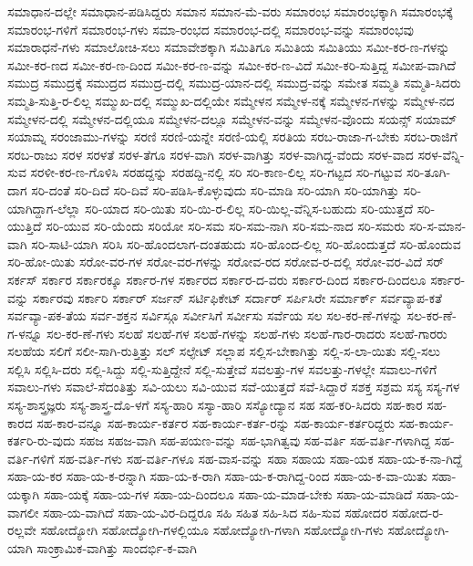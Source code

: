 {ಸಮಾಧಾನ-ದಲ್ಲೇ
ಸಮಾಧಾನ-ಪಡಿಸಿದ್ದರು
ಸಮಾನ
ಸಮಾನ-ಮೆ-ವರು
ಸಮಾರಂಭ
ಸಮಾರಂಭಕ್ಕಾಗಿ
ಸಮಾರಂಭಕ್ಕೆ
ಸಮಾರಂಭ-ಗಳಿಗೆ
ಸಮಾರಂಭ-ಗಳು
ಸಮಾ-ರಂಭದ
ಸಮಾರಂಭ-ದಲ್ಲಿ
ಸಮಾರಂಭ-ವನ್ನು
ಸಮಾರಂಭವು
ಸಮಾರಾಧನೆ-ಗಳು
ಸಮಾಲೋಚಿ-ಸಲು
ಸಮಾವೇಶಕ್ಕಾಗಿ
ಸಮಿತಿಗೂ
ಸಮಿತಿಯ
ಸಮಿತಿಯು
ಸಮೀ-ಕರ-ಣ-ಗಳನ್ನು
ಸಮೀ-ಕರ-ಣದ
ಸಮೀ-ಕರ-ಣ-ದಿಂದ
ಸಮೀ-ಕರ-ಣ-ವನ್ನು
ಸಮೀ-ಕರ-ಣ-ವಿದೆ
ಸಮೀ-ಕರಿ-ಸುತ್ತಿದ್ದ
ಸಮೀಪ-ವಾಗಿದೆ
ಸಮುದ್ರ
ಸಮುದ್ರಕ್ಕೆ
ಸಮುದ್ರದ
ಸಮುದ್ರ-ದಲ್ಲಿ
ಸಮುದ್ರ-ಯಾನ-ದಲ್ಲಿ
ಸಮುದ್ರ-ವನ್ನು
ಸಮೇತ
ಸಮ್ಮತಿ
ಸಮ್ಮತಿ-ಸಿದರು
ಸಮ್ಮತಿ-ಸುತ್ತಿ-ರ-ಲಿಲ್ಲ
ಸಮ್ಮುಖ-ದಲ್ಲಿ
ಸಮ್ಮುಖ-ದಲ್ಲಿಯೇ
ಸಮ್ಮೇಳನ
ಸಮ್ಮೇಳ-ನಕ್ಕೆ
ಸಮ್ಮೇಳನ-ಗಳನ್ನು
ಸಮ್ಮೇಳ-ನದ
ಸಮ್ಮೇಳನ-ದಲ್ಲಿ
ಸಮ್ಮೇಳನ-ದಲ್ಲಿಯೂ
ಸಮ್ಮೇಳನ-ದಲ್ಲೂ
ಸಮ್ಮೇಳನ-ವನ್ನು
ಸಮ್ಮೇಳನ-ವೊಂದು
ಸಯನ್ಸ್
ಸಯಾಮ್
ಸಯಾಮ್ನ
ಸರಂಜಾಮು-ಗಳನ್ನು
ಸರಣಿ
ಸರಣಿ-ಯನ್ನೇ
ಸರಣಿ-ಯಲ್ಲಿ
ಸರತಿಯ
ಸರಬ-ರಾಜಾ-ಗ-ಬೇಕು
ಸರಬ-ರಾಜಿಗೆ
ಸರಬ-ರಾಜು
ಸರಳ
ಸರಳತೆ
ಸರಳ-ತೆಗೂ
ಸರಳ-ವಾಗಿ
ಸರಳ-ವಾಗಿತ್ತು
ಸರಳ-ವಾಗಿದ್ದ-ವೆಂದು
ಸರಳ-ವಾದ
ಸರಳ-ವೆನ್ನಿ-ಸುವ
ಸರಳೀ-ಕರ-ಣ-ಗೊಳಿಸಿ
ಸರಹದ್ದನ್ನು
ಸರಹದ್ದಿ-ನಲ್ಲಿ
ಸರಿ
ಸರಿ-ಕಾಣ-ಲಿಲ್ಲ
ಸರಿ-ಗಟ್ಟದ
ಸರಿ-ಗಟ್ಟುವ
ಸರಿ-ತೂಗಿ-ದಾಗ
ಸರಿ-ದಂತೆ
ಸರಿ-ದಿದೆ
ಸರಿ-ದಿವೆ
ಸರಿ-ಪಡಿಸಿ-ಕೊಳ್ಳುವುದು
ಸರಿ-ಮಾಡಿ
ಸರಿ-ಯಾಗಿ
ಸರಿ-ಯಾಗಿತ್ತು
ಸರಿ-ಯಾಗಿದ್ದಾಗ-ಲೆಲ್ಲಾ
ಸರಿ-ಯಾದ
ಸರಿ-ಯಿತು
ಸರಿ-ಯಿ-ರ-ಲಿಲ್ಲ
ಸರಿ-ಯಿಲ್ಲ-ವೆನ್ನಿಸ-ಬಹುದು
ಸರಿ-ಯುತ್ತದೆ
ಸರಿ-ಯುತ್ತಿದೆ
ಸರಿ-ಯುವ
ಸರಿ-ಯೆಂದು
ಸರಿಯೋ
ಸರಿ-ಸಮ
ಸರಿ-ಸಮ-ನಾಗಿ
ಸರಿ-ಸಮ-ನಾದ
ಸರಿ-ಸಮರು
ಸರಿ-ಸ-ಮಾನ-ವಾಗಿ
ಸರಿ-ಸಾಟಿ-ಯಾಗಿ
ಸರಿಸಿ
ಸರಿ-ಹೊಂದಲಾಗ-ದಂತಹುದು
ಸರಿ-ಹೊಂದ-ಲಿಲ್ಲ
ಸರಿ-ಹೊಂದುತ್ತದೆ
ಸರಿ-ಹೊಂದುವ
ಸರಿ-ಹೋ-ಯಿತು
ಸರೋ-ವರ-ಗಳ
ಸರೋ-ವರ-ಗಳನ್ನು
ಸರೋವ-ರದ
ಸರೋವ-ರ-ದಲ್ಲಿ
ಸರೋ-ವರ-ವಿದೆ
ಸರ್
ಸರ್ಕಸ್
ಸರ್ಕಾರ
ಸರ್ಕಾರಕ್ಕೂ
ಸರ್ಕಾರ-ಗಳ
ಸರ್ಕಾರದ
ಸರ್ಕಾರ-ದ-ವರು
ಸರ್ಕಾರ-ದಿಂದ
ಸರ್ಕಾರ-ದಿಂದಲೂ
ಸರ್ಕಾರ-ವನ್ನು
ಸರ್ಕಾರವು
ಸರ್ಕಾರಿ
ಸರ್ಕಾರ್
ಸರ್ಜನ್
ಸರ್ಟಿಫಿಕೇಟ್
ಸರ್ದಾರ್
ಸರ್ಪಿಸಿರೇ
ಸರ್ಮಾರ್ಕ್
ಸರ್ವವ್ಯಾಪ-ಕತೆ
ಸರ್ವವ್ಯಾ-ಪಕ-ತೆಯ
ಸರ್ವ-ಶಕ್ತನ
ಸರ್ವಿಸ್ಗೂ
ಸರ್ವೀಸಿಗೆ
ಸರ್ವೀಸು
ಸರ್ವೆಯ
ಸಲ
ಸಲ-ಕರ-ಣೆ-ಗಳನ್ನು
ಸಲ-ಕರ-ಣೆ-ಗ-ಳನ್ನೂ
ಸಲ-ಕರ-ಣೆ-ಗಳು
ಸಲಹೆ
ಸಲಹೆ-ಗಳ
ಸಲಹೆ-ಗಳನ್ನು
ಸಲಹೆ-ಗಳು
ಸಲಹೆ-ಗಾರ-ರಾದರು
ಸಲಹೆ-ಗಾರರು
ಸಲಹೆಯ
ಸಲಿಗೆ
ಸಲೀ-ಸಾಗಿ-ರುತ್ತಿತ್ತು
ಸಲ್
ಸಲ್ಫೇಟ್
ಸಲ್ಲಾಪ
ಸಲ್ಲಿಸ-ಬೇಕಾಗಿತ್ತು
ಸಲ್ಲಿ-ಸ-ಲಾ-ಯಿತು
ಸಲ್ಲಿ-ಸಲು
ಸಲ್ಲಿಸಿ
ಸಲ್ಲಿಸಿ-ದರು
ಸಲ್ಲಿ-ಸಿದ್ದು
ಸಲ್ಲಿ-ಸುತ್ತಿದ್ದೇನೆ
ಸಲ್ಲಿ-ಸುತ್ತೇವೆ
ಸವಲತ್ತು-ಗಳ
ಸವಲತ್ತು-ಗಳಲ್ಲೇ
ಸವಾಲು-ಗಳಿಗೆ
ಸವಾಲು-ಗಳು
ಸವಾಲೆ-ಸೆದಂತಿತ್ತು
ಸವಿ-ಯಲು
ಸವಿ-ಯುವ
ಸವೆ-ಯುತ್ತದೆ
ಸವೆ-ಸಿದ್ದಾರೆ
ಸಶಕ್ತ
ಸಶ್ರಮ
ಸಸ್ಯ
ಸಸ್ಯ-ಗಳ
ಸಸ್ಯ-ಶಾಸ್ತ್ರಜ್ಞರು
ಸಸ್ಯ-ಶಾಸ್ತ್ರ-ದೊ-ಳಗೆ
ಸಸ್ಯ-ಹಾರಿ
ಸಸ್ಯಾ-ಹಾರಿ
ಸಸ್ಯೋದ್ಯಾನ
ಸಹ
ಸಹ-ಕರಿ-ಸಿದರು
ಸಹ-ಕಾರ
ಸಹ-ಕಾರದ
ಸಹ-ಕಾರ-ವನ್ನೂ
ಸಹ-ಕಾರ್ಯ-ಕರ್ತರ
ಸಹ-ಕಾರ್ಯ-ಕರ್ತ-ರನ್ನು
ಸಹ-ಕಾರ್ಯ-ಕರ್ತರಿದ್ದರು
ಸಹ-ಕಾರ್ಯ-ಕರ್ತರಿ-ರು-ವುದು
ಸಹಜ
ಸಹಜ-ವಾಗಿ
ಸಹ-ಪಯಣ-ವನ್ನು
ಸಹ-ಭಾಗಿತ್ವವು
ಸಹ-ವರ್ತಿ
ಸಹ-ವರ್ತಿ-ಗಳಾಗಿದ್ದ
ಸಹ-ವರ್ತಿ-ಗಳಿಗೆ
ಸಹ-ವರ್ತಿ-ಗಳು
ಸಹ-ವರ್ತಿ-ಗಳೂ
ಸಹ-ವಾಸ-ವನ್ನು
ಸಹಾ
ಸಹಾಯ
ಸಹಾ-ಯಕ
ಸಹಾ-ಯ-ಕ-ನಾ-ಗಿದ್ದೆ
ಸಹಾ-ಯ-ಕರ
ಸಹಾ-ಯ-ಕ-ರನ್ನಾಗಿ
ಸಹಾ-ಯ-ಕ-ರಾಗಿ
ಸಹಾ-ಯ-ಕ-ರಾಗಿದ್ದ-ರಿಂದ
ಸಹಾ-ಯ-ಕ-ವಾ-ಯಿತು
ಸಹಾ-ಯಕ್ಕಾಗಿ
ಸಹಾ-ಯಕ್ಕೆ
ಸಹಾ-ಯ-ಗಳ
ಸಹಾ-ಯ-ದಿಂದಲೂ
ಸಹಾ-ಯ-ಮಾಡ-ಬೇಕು
ಸಹಾ-ಯ-ಮಾಡಿದೆ
ಸಹಾ-ಯ-ವಾಗಲೀ
ಸಹಾ-ಯ-ವಾಗಿದೆ
ಸಹಾ-ಯ-ವಿರ-ದಿದ್ದರೂ
ಸಹಿ
ಸಹಿತ
ಸಹಿ-ಸಿದ
ಸಹಿ-ಸುವ
ಸಹೋದರ
ಸಹೋದ-ರ-ರಲ್ಲವೇ
ಸಹೋದ್ಯೋಗಿ
ಸಹೋದ್ಯೋಗಿ-ಗಳಲ್ಲಿಯೂ
ಸಹೋದ್ಯೋಗಿ-ಗಳಾಗಿ
ಸಹೋದ್ಯೋಗಿ-ಗಳು
ಸಹೋದ್ಯೋಗಿ-ಯಾಗಿ
ಸಾಂಕ್ರಾಮಿಕ-ವಾಗಿತ್ತು
ಸಾಂದರ್ಭಿ-ಕ-ವಾಗಿ
}
